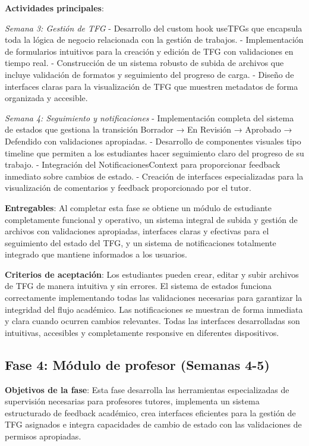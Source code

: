 \documentclass[12pt,a4paper,oneside]{report}
\begin{document}
\textbf{Actividades principales}:

\emph{Semana 3: Gestión de TFG} - Desarrollo del custom hook useTFGs que encapsula toda la lógica de negocio relacionada con la gestión de trabajos. - Implementación de formularios intuitivos para la creación y edición de TFG con validaciones en tiempo real. - Construcción de un sistema robusto de subida de archivos que incluye validación de formatos y seguimiento del progreso de carga. - Diseño de interfaces claras para la visualización de TFG que muestren metadatos de forma organizada y accesible.

\emph{Semana 4: Seguimiento y notificaciones} - Implementación completa del sistema de estados que gestiona la transición Borrador → En Revisión → Aprobado → Defendido con validaciones apropiadas. - Desarrollo de componentes visuales tipo timeline que permiten a los estudiantes hacer seguimiento claro del progreso de su trabajo. - Integración del NotificacionesContext para proporcionar feedback inmediato sobre cambios de estado. - Creación de interfaces especializadas para la visualización de comentarios y feedback proporcionado por el tutor.

\textbf{Entregables}: Al completar esta fase se obtiene un módulo de estudiante completamente funcional y operativo, un sistema integral de subida y gestión de archivos con validaciones apropiadas, interfaces claras y efectivas para el seguimiento del estado del TFG, y un sistema de notificaciones totalmente integrado que mantiene informados a los usuarios.

\textbf{Criterios de aceptación}: Los estudiantes pueden crear, editar y subir archivos de TFG de manera intuitiva y sin errores. El sistema de estados funciona correctamente implementando todas las validaciones necesarias para garantizar la integridad del flujo académico. Las notificaciones se muestran de forma inmediata y clara cuando ocurren cambios relevantes. Todas las interfaces desarrolladas son intuitivas, accesibles y completamente responsive en diferentes dispositivos.

\subsection{Fase 4: Módulo de profesor (Semanas
4-5)}\label{fase-4-muxf3dulo-de-profesor-semanas-4-5}

\textbf{Objetivos de la fase}: Esta fase desarrolla las herramientas especializadas de supervisión necesarias para profesores tutores, implementa un sistema estructurado de feedback académico, crea interfaces eficientes para la gestión de TFG asignados e integra capacidades de cambio de estado con las validaciones de permisos apropiadas.
\end{document}
